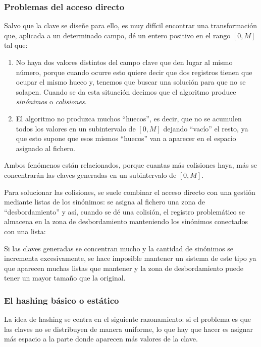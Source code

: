 \documentclass[10pt,a4paper,spanish]{report}
\begin{document}
\textcolor[rgb]{1,0.2,0.3}{\subsubsection{Problemas del acceso directo}}
Salvo que la clave se diseñe para ello, es muy difícil encontrar una transformación que, aplicada a un determinado campo, dé un entero positivo en el rango $[0,M]$ tal que:

\begin{enumerate}[$\heartsuit$]
    \item No haya dos valores distintos del campo clave que den lugar al mismo número, porque cuando ocurre esto quiere decir que dos registros tienen que ocupar el mismo hueco y, tenemos que buscar una solución para que no se solapen. Cuando se da esta situación decimos que el algoritmo produce \textcolor[rgb]{1,0.2,0.3}{\textit{sinónimos}} o \textcolor[rgb]{1,0.2,0.3}{\textit{colisiones}}.

    \item El algoritmo no produzca muchos ``huecos'', es decir, que no se acumulen todos los valores en un subintervalo de $[0,M]$ dejando ``vacío'' el resto, ya que esto supone que esos mismos ``huecos'' van a aparecer en el espacio asignado al fichero.
\end{enumerate}

Ambos fenómenos están relacionados, porque cuantas más colisiones haya, más se concentrarán las claves generadas en un subintervalo de $[0,M]$.

Para solucionar las colisiones, se suele combinar el acceso directo con una gestión mediante listas de los sinónimos: se asigna al fichero una zona de ``desbordamiento'' y así, cuando se dé una colisión, el registro problemático se almacena en la zona de desbordamiento manteniendo los sinónimos conectados con una lista:



Si las claves generadas se concentran mucho y la cantidad de sinónimos se incrementa excesivamente, se hace imposible mantener un sistema de este tipo ya que aparecen muchas listas que mantener y la zona de desbordamiento puede tener un mayor tamaño que la original.

\textcolor[rgb]{1,0.2,0.3}{\subsubsection{El hashing básico o estático}}
La idea de hashing se centra en el siguiente razonamiento: si el problema es que las claves no se distribuyen de manera uniforme, lo que hay que hacer es asignar más espacio a la parte donde aparecen más valores de la clave.
\end{document}
